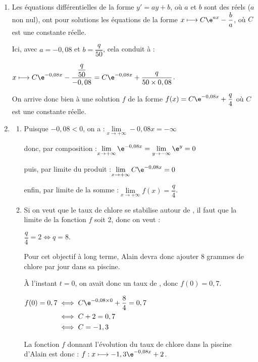 \begin{enumerate}
\item Les équations différentielles de la forme \quad$y' = ay + b$, où $a$ et $b$ sont des réels ($a$ non nul), ont pour solutions les équations de la forme \quad $x\longmapsto C\e^{ax} - \dfrac{b}{a}$, où $C$ est une constante réelle.

Ici, avec $a = -0,08$ et $b = \dfrac{q}{50}$, cela conduit à :

$x\longmapsto C\e^{-0,08x} - \dfrac{\dfrac{q}{50}}{-0,08} = C\e^{-0,08x} + \dfrac{q}{50\times 0,08}$.

On arrive donc bien à une solution $f$ de la forme $f(x)=C \e^{-0,08 x}+\dfrac{q}{4}$ où $C$ est une constante réelle.

\item
	\begin{enumerate}
		\item Puisque $-0,08<0$, on a :\quad $\lim\limits_{x \to +\infty}-0,08x = -\infty$

donc, par composition :\quad $\lim\limits_{x \to +\infty}\e^{-0,08x} = \lim\limits_{y \to -\infty} \e^y = 0$

puis, par limite du produit :\quad $ \lim\limits_{x \to +\infty}C\e^{-0,08x} = 0$

enfin, par limite de la somme :\quad $\lim\limits_{x \to +\infty}f(x) = \dfrac{q}{4}$.

		\item Si on veut que le taux de chlore se stabilise autour de , il faut que la limite de la fonction $f$ soit 2, donc on veut :

$\dfrac{q}{4} = 2 \iff q = 8$.

Pour cet objectif à long terme, Alain devra donc ajouter 8 grammes de chlore par jour dans sa piscine.

À l'instant $t = 0$, on avait donc un	taux de , donc $f(0) = 0,7$.

$\begin{aligned}[t] f(0) = 0,7 &\iff C\e^{-0,08\times 0} + \dfrac{8}{4} =0,7\\
&\iff C + 2 = 0,7\\
&\iff C = -1,3\end{aligned}$

La fonction $f$ donnant l'évolution du taux de chlore dans la piscine d'Alain est donc :
\quad$f :x \longmapsto -1,3\e^{-0,08x} + 2$.
	\end{enumerate}
\end{enumerate}

\medskip
